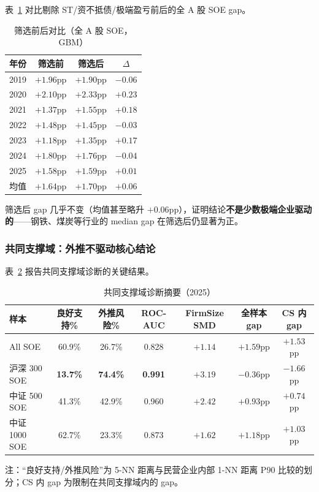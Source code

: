 \documentclass[11pt,a4paper]{ctexart}
\begin{document}
表~\ref{tab:screening} 对比剔除 ST/资不抵债/极端盈亏前后的全 A 股 SOE gap。

\begin{table}[htbp]
\centering
\caption{筛选前后对比（全 A 股 SOE，GBM）}
\label{tab:screening}
\begin{threeparttable}
\small
\begin{tabular}{lccc}
\toprule
年份 & 筛选前 & 筛选后 & $\Delta$ \\
\midrule
2019 & $+1.96$pp & $+1.90$pp & $-0.06$ \\
2020 & $+2.10$pp & $+2.33$pp & $+0.23$ \\
2021 & $+1.37$pp & $+1.55$pp & $+0.18$ \\
2022 & $+1.48$pp & $+1.45$pp & $-0.03$ \\
2023 & $+1.18$pp & $+1.35$pp & $+0.17$ \\
2024 & $+1.80$pp & $+1.76$pp & $-0.04$ \\
2025 & $+1.58$pp & $+1.59$pp & $+0.01$ \\
\midrule
均值 & $+1.64$pp & $+1.70$pp & $+0.06$ \\
\bottomrule
\end{tabular}
\end{threeparttable}
\end{table}

筛选后 gap 几乎不变（均值甚至略升 $+0.06$pp），证明结论\textbf{不是少数极端企业驱动的}——钢铁、煤炭等行业的 median gap 在筛选后仍显著为正。

\subsubsection{共同支撑域：外推不驱动核心结论}

表~\ref{tab:cs} 报告共同支撑域诊断的关键结果。

\begin{table}[htbp]
\centering
\caption{共同支撑域诊断摘要（2025）}
\label{tab:cs}
\begin{threeparttable}
\small
\begin{tabular}{lcccccc}
\toprule
样本 & 良好支持\% & 外推风险\% & ROC-AUC & FirmSize SMD & 全样本 gap & CS 内 gap \\
\midrule
All SOE & 60.9\% & 26.7\% & 0.828 & $+1.14$ & $+1.59$pp & $+1.53$pp \\
沪深 300 SOE & \textbf{13.7\%} & \textbf{74.4\%} & \textbf{0.991} & \textbf{$+3.19$} & $-0.36$pp & $-1.66$pp \\
中证 500 SOE & 41.3\% & 42.9\% & 0.960 & $+2.42$ & $+0.93$pp & $+0.74$pp \\
中证 1000 SOE & 62.7\% & 23.3\% & 0.873 & $+1.62$ & $+1.18$pp & $+1.03$pp \\
\bottomrule
\end{tabular}
\begin{tablenotes}
\footnotesize\raggedright
\item 注：“良好支持/外推风险”为 5-NN 距离与民营企业内部 1-NN 距离 P90 比较的划分；CS 内 gap 为限制在共同支撑域内的 gap。
\end{tablenotes}
\end{threeparttable}
\end{table}
\end{document}
